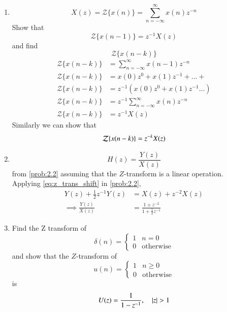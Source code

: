 \documentclass[journal,12pt,twocolumn]{IEEEtran}
\theoremstyle{remark}
\begin{document}
\begin{enumerate}[label=\thesection.\arabic*
,ref=\thesection.\theenumi]
\begin{enumerate}[label=\thesection.\arabic*
,ref=\thesection.\theenumi]
\section{Z-Transform}
\item 
\begin{equation}
X(z)={\mathcal {Z}}\{x(n)\}=\sum _{n=-\infty }^{\infty }x(n)z^{-n}
\end{equation}
Show that
\begin{equation}
\label{eq:shift1}
{\mathcal {Z}}\{x(n-1)\} = z^{-1}X(z)
\end{equation}
and find
\begin{equation}
	{\mathcal {Z}}\{x(n-k)\} 
\end{equation}
\solution 
\begin{align}
    {\mathcal {Z}}\{x(n-k)\}&=\sum _{n=-\infty }^{\infty }x(n-1)z^{-n}\\
    {\mathcal {Z}}\{x(n-k)\}&=x(0)z^{0}+x(1)z^{-1}+...+\\
    {\mathcal {Z}}\{x(n-k)\}&=z^{-1}(x(0)z^{0}+x(1)z^{-1}...)\\
    {\mathcal {Z}}\{x(n-k)\}&=z^{-1}\sum _{n=-\infty }^{\infty }x(n)z^{-n}\\
    {\mathcal {Z}}\{x(n-k)\}&=z^{-1}X(z)
\end{align}
Similarly we can show that 
\begin{equation}
\label{eq:z_trans_shift}
	{\mathcal {Z}}\{x(n-k)\} = z^{-k}X(z)\\
\end{equation}
\item \begin{equation}
H(z) = \frac{Y(z)}{X(z)}
\end{equation}
from \eqref{prob:2.2} assuming that the $Z$-transform is a linear operation.
\\
\solution  Applying \eqref{eq:z_trans_shift} in \eqref{prob:2.2},
\begin{align}
Y(z) + \frac{1}{2}z^{-1}Y(z) &= X(z)+z^{-2}X(z)
\\
\implies \frac{Y(z)}{X(z)} &= \frac{1 + z^{-2}}{1 + \frac{1}{2}z^{-1}}
\label{eq:freq_resp}
\end{align}


\item Find the Z transform of 
\begin{equation}
\delta(n)
=
\begin{cases}
1 & n = 0
\\
0 & \text{otherwise}
\end{cases}
\end{equation}
and show that the $Z$-transform of
\begin{equation}
\label{eq:unit_step}
u(n)
=
\begin{cases}
1 & n \ge 0
\\
0 & \text{otherwise}
\end{cases}
\end{equation}
is
\begin{equation}
U(z) = \frac{1}{1-z^{-1}}, \quad \left\vert z\right\vert > 1
\end{equation}



\end{enumerate}
\end{enumerate}
\end{document}
